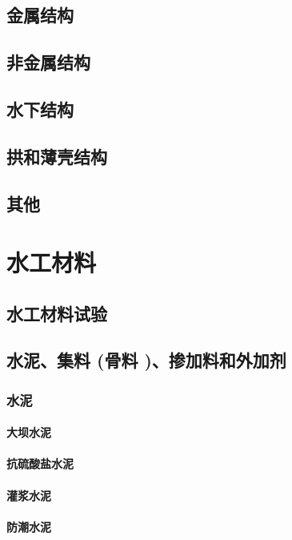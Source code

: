 \documentclass[UTF8]{../../ApplicationUniverse}
\begin{document}
\section{金属结构}
\section{非金属结构}
\section{水下结构}
\section{拱和薄壳结构}
\section{其他}










\chapter{水工材料}
\section{水工材料试验}
\section{水泥、集料 (骨料 )、掺加料和外加剂}
    \subsection{水泥}
        \subsubsection{大坝水泥}
        \subsubsection{抗硫酸盐水泥}
        \subsubsection{灌浆水泥}
        \subsubsection{防潮水泥}
\end{document}
